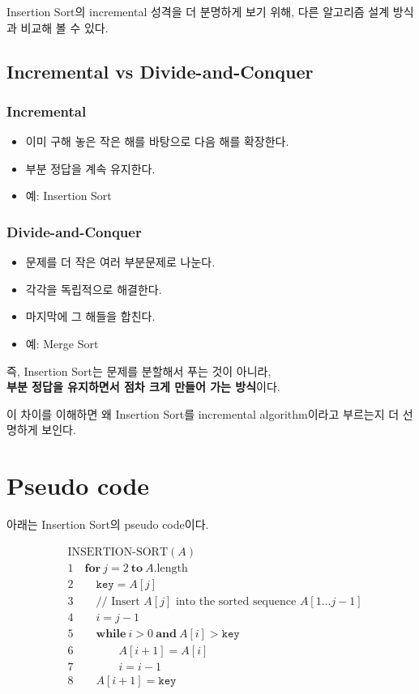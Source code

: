 \documentclass[
  korean,
]{article}
\providecommand{\tightlist}{%
  \setlength{\itemsep}{0pt}\setlength{\parskip}{0pt}}
\begin{document}
Insertion Sort의 incremental 성격을 더 분명하게 보기 위해, 다른 알고리즘
설계 방식과 비교해 볼 수 있다.

\subsection{Incremental vs
Divide-and-Conquer}\label{incremental-vs-divide-and-conquer}

\subsubsection{Incremental}\label{incremental}

\begin{itemize}
\tightlist
\item
  이미 구해 놓은 작은 해를 바탕으로 다음 해를 확장한다.
\item
  부분 정답을 계속 유지한다.
\item
  예: Insertion Sort
\end{itemize}

\subsubsection{Divide-and-Conquer}\label{divide-and-conquer}

\begin{itemize}
\tightlist
\item
  문제를 더 작은 여러 부분문제로 나눈다.
\item
  각각을 독립적으로 해결한다.
\item
  마지막에 그 해들을 합친다.
\item
  예: Merge Sort
\end{itemize}

즉, Insertion Sort는 문제를 분할해서 푸는 것이 아니라,\\
\textbf{부분 정답을 유지하면서 점차 크게 만들어 가는 방식}이다.

이 차이를 이해하면 왜 Insertion Sort를 incremental algorithm이라고
부르는지 더 선명하게 보인다.

\section{Pseudo code}\label{pseudo-code}

아래는 Insertion Sort의 pseudo code이다.

\[
\begin{aligned}
&\text{INSERTION-SORT}(A) \\
&1\quad \mathbf{for}\ j = 2\ \mathbf{to}\ A.\mathrm{length} \\
&2\qquad \mathtt{key} = A[j] \\
&3\qquad \text{// Insert } A[j] \text{ into the sorted sequence } A[1 \ldots j-1] \\
&4\qquad i = j - 1 \\
&5\qquad \mathbf{while}\ i > 0 \ \mathbf{and}\ A[i] > \mathtt{key} \\
&6\qquad\qquad A[i+1] = A[i] \\
&7\qquad\qquad i = i - 1 \\
&8\qquad A[i+1] = \mathtt{key}
\end{aligned}
\]
\end{document}
